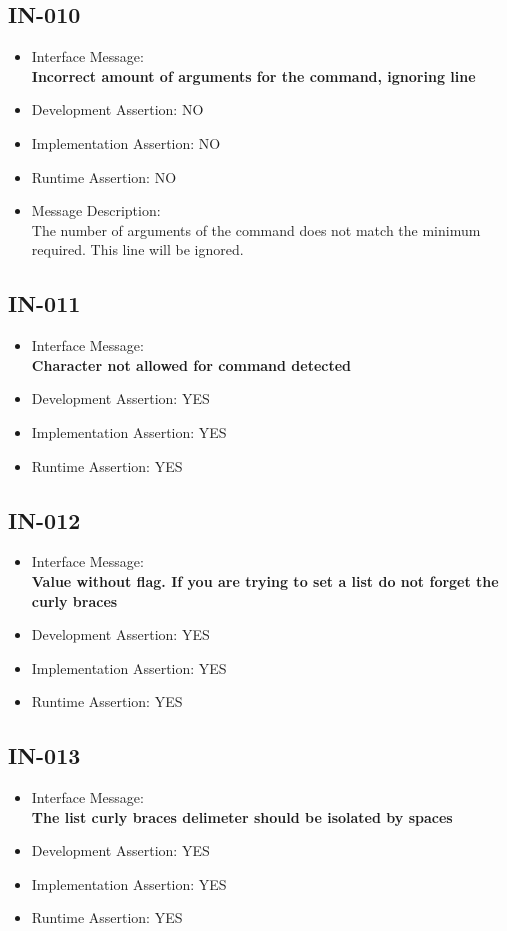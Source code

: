 \subsection{IN-010}
\begin{itemize}
  \item Interface Message:\\[1em]
    \textbf{Incorrect amount of arguments for the command, ignoring line}
  \item Development Assertion: NO
  \item Implementation Assertion: NO
  \item Runtime Assertion: NO
  \item Message Description:\\[1em]
    The number of arguments of the command does not match the minimum required. This line will be ignored.
\end{itemize}

\subsection{IN-011}
\begin{itemize}
  \item Interface Message:\\[1em]
    \textbf{Character not allowed for command detected}
  \item Development Assertion: YES
  \item Implementation Assertion: YES
  \item Runtime Assertion: YES
\end{itemize}

\subsection{IN-012}
\begin{itemize}
  \item Interface Message:\\[1em]
    \textbf{Value without flag. If you are trying to set a list do not forget the curly braces}
  \item Development Assertion: YES
  \item Implementation Assertion: YES
  \item Runtime Assertion: YES
\end{itemize}

\subsection{IN-013}
\begin{itemize}
  \item Interface Message:\\[1em]
    \textbf{The list curly braces delimeter should be isolated by spaces}
  \item Development Assertion: YES
  \item Implementation Assertion: YES
  \item Runtime Assertion: YES
\end{itemize}

